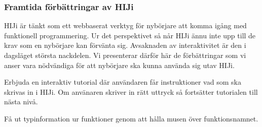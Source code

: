 \subsubsection{Framtida förbättringar av HIJi}
HIJi är tänkt som ett webbaserat verktyg för nybörjare att komma igång med funktionell programmering. Ur det perspektivet så når HIJi ännu inte upp till de krav som en nybörjare kan förvänta sig. Avsaknaden av interaktivitet är den i dagsläget största nackdelen. Vi presenterar därför här de förbättringar som vi anser vara nödvändiga för att nybörjare ska kunna använda sig utav HIJi.

Erbjuda en interaktiv tutorial där användaren får instruktioner vad som ska skrivas in i HIJi. Om använaren skriver in rätt uttryck så fortsätter tutorialen till nästa nivå.

Få ut typinformation ur funktioner genom att hålla musen över funktionsnamnet. 
